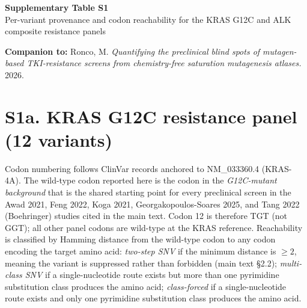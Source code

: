 \documentclass[10pt,a4paper,landscape]{article}
\begin{document}
\begin{center}
{\Large\bfseries Supplementary Table S1\\[2pt]}
{\normalsize Per-variant provenance and codon reachability for the KRAS G12C and ALK composite resistance panels}
\end{center}

\vspace{4pt}

\noindent\textbf{Companion to:} Ronco, M. \emph{Quantifying the preclinical blind spots of mutagen-based TKI-resistance screens from chemistry-free saturation mutagenesis atlases.} 2026.

\vspace{10pt}

\section*{S1a. KRAS G12C resistance panel (12 variants)}

\noindent Codon numbering follows ClinVar records anchored to NM\_033360.4 (KRAS-4A). The wild-type codon reported here is the codon in the \emph{G12C-mutant background} that is the shared starting point for every preclinical screen in the Awad 2021, Feng 2022, Koga 2021, Georgakopoulos-Soares 2025, and Tang 2022 (Boehringer) studies cited in the main text. Codon 12 is therefore TGT (not GGT); all other panel codons are wild-type at the KRAS reference. Reachability is classified by Hamming distance from the wild-type codon to any codon encoding the target amino acid: \emph{two-step SNV} if the minimum distance is $\geq 2$, meaning the variant is suppressed rather than forbidden (main text \S2.2); \emph{multi-class SNV} if a single-nucleotide route exists but more than one pyrimidine substitution class produces the amino acid; \emph{class-forced} if a single-nucleotide route exists and only one pyrimidine substitution class produces the amino acid.

\vspace{6pt}
\end{document}
